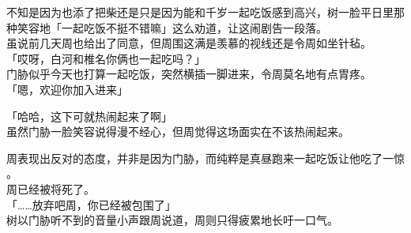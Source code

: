 不知是因为也添了把柴还是只是因为能和千岁一起吃饭感到高兴，树一脸平日里那种笑容地「一起吃饭不挺不错嘛」这么劝道，让这闹剧告一段落。\\

虽说前几天周也给出了同意，但周围这满是羡慕的视线还是令周如坐针毡。\\

「哎呀，白河和椎名你俩也一起吃吗？」\\

门胁似乎今天也打算一起吃饭，突然横插一脚进来，令周莫名地有点胃疼。\\

「嗯，欢迎你加入进来」

「哈哈，这下可就热闹起来了啊」\\

虽然门胁一脸笑容说得漫不经心，但周觉得这场面实在不该热闹起来。

周表现出反对的态度，并非是因为门胁，而纯粹是真昼跑来一起吃饭让他吃了一惊 。\\

周已经被将死了。\\

「……放弃吧周，你已经被包围了」\\

树以门胁听不到的音量小声跟周说道，周则只得疲累地长吁一口气。



